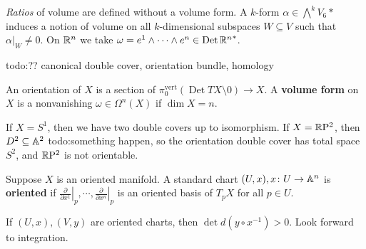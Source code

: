 \begin{remark}
\emph{Ratios} of volume are defined without a volume form. A $k$-form $\alpha  \in \bigwedge ^k V_6*$ induces a notion of volume on all $k$-dimensional subspaces $W \subseteq V$ such that $\alpha |_W\neq 0$. On $\mathbb{R}^n $ we take $\omega=e^1\wedge \cdots \wedge e^n  \in \operatorname{Det}{\mathbb{R}^n } ^*$.
\end{remark}
{\color{red}todo:?? canonical double cover, orientation bundle, homology} 
\begin{definition}[]
    An orientation of $X$ is a section of $\pi_0^{\text{vert} } (\operatorname{Det}TX\setminus 0)\to X$. A \textbf{volume form} on $X$ is a nonvanishing $\omega \in \Omega^n (X)$ if $\dim X=n$.
\end{definition}
\begin{example}
    If $X=S^1 $, then we have two double covers up to isomorphism. If $X=\mathbb{R} \mathrm P^2$, then $D^2 \subseteq \mathbb{A}^2$ {\color{red}todo:something happen}, so the orientation double cover has total space $S^2$, and $\mathbb{R} \mathrm P^2$ is not orientable.
\end{example}

\begin{definition}[]
    Suppose $X$ is an oriented manifold. A standard chart $(U,x), x \colon U \to \mathbb{A}^n $ is \textbf{oriented} if $\left. \frac{\partial }{\partial x^1} \right| _p,\cdots ,\left. \frac{\partial }{\partial x^n} \right| _p$ is an oriented basis of $T_p X$ for all $p \in U$. 
\end{definition}
If $(U,x),(V,y)$ are oriented charts, then $\det d(y \circ x^{-1})>0$. Look forward to integration.
